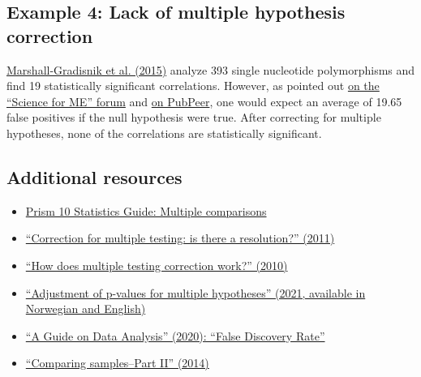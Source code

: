 \documentclass[letterpaper, 12pt]{article}
\begin{document}
\subsection*{Example 4: Lack of multiple hypothesis correction}

\href{https://doi.org/10.4137/iii.s25105}{Marshall-Gradisnik et al. (2015)} analyze 393 single nucleotide polymorphisms and find 19 statistically significant correlations.
However, as pointed out \href{https://www.s4me.info/threads/examination-of-single-nucleotide-polymorphisms-in-acetylcholine-receptors-in-chronic-fatigue-syndrome-patients-2015-marshall-gradisnik-et-al.36899/}{on the ``Science for ME'' forum} and \href{https://pubpeer.com/publications/49C2FDD37CE6BCEB7B47D8062F4BD4}{on PubPeer}, one would expect an average of 19.65 false positives if the null hypothesis were true.
After correcting for multiple hypotheses, none of the correlations are statistically significant.

\subsection*{Additional resources}

\begin{itemize}
    \setlength\itemsep{-0.5em}
     \item \href{https://www.graphpad.com/guides/prism/latest/statistics/stat_multiple_comparisons2.htm}{Prism 10 Statistics Guide: Multiple comparisons}
    \item \href{https://doi.org/10.1378/chest.11-0523}{``Correction for multiple testing: is there a resolution?'' (2011)}
    \item \href{https://doi.org/10.1038/nbt1209-1135}{``How does multiple testing correction work?'' (2010)}
    \item \href{https://doi.org/10.4045/tidsskr.21.0357}{``Adjustment of p-values for multiple hypotheses'' (2021, available in Norwegian and English)}
    \item \href{https://bookdown.org/mike/data_analysis/sec-false-discovery-rate.html}{``A Guide on Data Analysis'' (2020): ``False Discovery Rate''}
    \item \href{https://doi.org/10.1038/nmeth.2900}{``Comparing samples--Part II'' (2014)}
\end{itemize}
\end{document}
